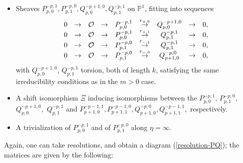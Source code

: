 \documentclass[12pt]{article}
\theoremstyle{definition}
\theoremstyle{remark}
\numberwithin{theorem}{section}
\def\bP{{\mathbb {P}}}
\def\pO{{\mathcal O}}
\begin{document}
 

\begin{itemize} 
\item Sheaves $ P_{p,0}^{-p,1}, P_{p,1}^{-p,0}, Q_{p,0}^{-p+1,0}, Q_{p,1}^{-p,1}$ on $\bP^1$, fitting into sequences 
\begin{equation}\label{sheaf-sequences-2.1} 
\begin{matrix}
0&\rightarrow& \pO &\rightarrow& P_{p,0}^{-p,1}&\buildrel{r_{+,0}}\over{\rightarrow}& Q_{p,0}^{-p+1,0}&\rightarrow&0,\\
0&\rightarrow& \pO&\rightarrow& P_{p,0}^{-p,1}&\buildrel{r_{+,1}}\over{\rightarrow}& Q_{p,1}^{-p,1}&\rightarrow&0,\\
0&\rightarrow& \pO &\rightarrow& P_{p,1}^{-p,0}&\buildrel{r_{-,1}}\over{\rightarrow}& Q_{p,1}^{-p,1}&\rightarrow&0,\\
0&\rightarrow& \pO &\rightarrow& P_{p,1}^{-p,0}&\buildrel{r_{-,0}}\over{\rightarrow}& Q_{p+1,0}^{-p,0}&\rightarrow&0,
\end{matrix}
\end{equation}
with   $Q_{p,0}^{-p+1,0}$, $Q_{p,1}^{-p ,1}$ torsion, both of length $k$, satisfying the same irreducibility conditions as in the $m>0$ case.
\item  A shift isomorphism $\Xi$ inducing isomorphisms between the  $P_{p,0}^{-p,1}$, $P_{p,1}^{-p,0},$ $Q_{p,0}^{-p+1,0},$ $Q_{p,1}^{-p,1}$ and $P_{p+1,0}^{-p-1,1},P_{p+1,1}^{-p-1,0} ,Q_{p+1,0}^{-p ,0}, Q_{p+1,1}^{-p-1,1},$ respectively.
\item A trivialization of $P_{p,0}^{-p,1}$ and of $P_{p,1}^{-p,0}$ along $\eta = \infty$.
\end{itemize}
 Again, one can take   resolutions, and obtain  a diagram (\ref{resolution-PQ}); the matrices are given by the following:
\end{document}

